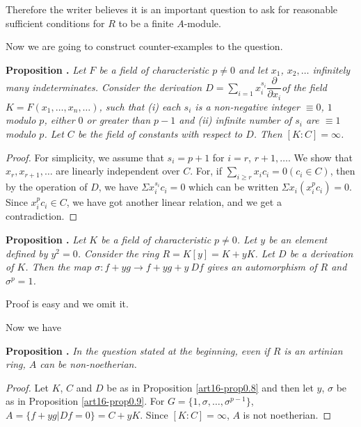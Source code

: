 Therefore the writer believes it is an important question to ask for reasonable sufficient conditions for $R$ to be a finite $A$-module.

Now we are going to construct counter-examples to the question.

\medskip
\noindent
{\bf Proposition .\label{art16-prop0.8}}
{\em Let $F$ be a field of characteristic $p\neq 0$ and let $x_{1}$, $x_{2},\ldots$ infinitely many indeterminates. Consider the derivation $D=\sum\limits_{i=1}x^{s_{i}}_{i}\dfrac{\partial}{\partial x_{i}}$\pageoriginale of the field $K=F(x_{1},\ldots,x_{n},\ldots)$, such that {\rm(i)} each $s_{i}$ is a non-negative integer $\equiv 0$, $1$ modulo $p$, either $0$ or greater than $p-1$ and {\rm(ii)} infinite number of $s_{i}$ are $\equiv 1$ modulo $p$. Let $C$ be the field of constants with respect to $D$. Then $[K:C]=\infty$.}

\begin{proof}
For simplicity, we assume that $s_{i}=p+1$ for $i=r$, $r+1,\ldots$. We show that $x_{r},x_{r+1},\ldots$ are linearly independent over $C$. For, if $\sum\limits_{i\geq r}x_{i}c_{i}=0 (c_{i}\in C)$, then by the operation of $D$, we have $\Sigma x^{s_{i}}_{i}c_{i}=0$ which can be written $\Sigma x_{i}(x^{p}_{i}c_{i})=0$. Since $x^{p}_{i}c_{i}\in C$, we have got another linear relation, and we get a contradiction.
\end{proof}

\medskip
\noindent
{\bf Proposition .\label{art16-prop0.9}}
{\em Let $K$ be a field of characteristic $p\neq 0$. Let $y$ be an element defined by $y^{2}=0$. Consider the ring $R=K[y]=K+yK$. Let $D$ be a derivation of $K$. Then the map $\sigma:f+yg\to f+yg+y \ Df$ gives an automorphism of $R$ and $\sigma^{p}=1$.}
\smallskip

Proof is easy and we omit it.

Now we have

\medskip
\noindent
{\bf Proposition .\label{art16-prop0.10}}
{\em In the question stated at the beginning, even if $R$ is an artinian ring, $A$ can be non-noetherian.}

\begin{proof}
Let $K$, $C$ and $D$ be as in Proposition \ref{art16-prop0.8} and then let $y$, $\sigma$ be as in Proposition \ref{art16-prop0.9}. For $G=\{1,\sigma,\ldots,\sigma^{p-1}\}$, $A=\{f+yg | Df=0\}=C+yK$. Since $[K:C]=\infty$, $A$ is not noetherian.
\end{proof}

